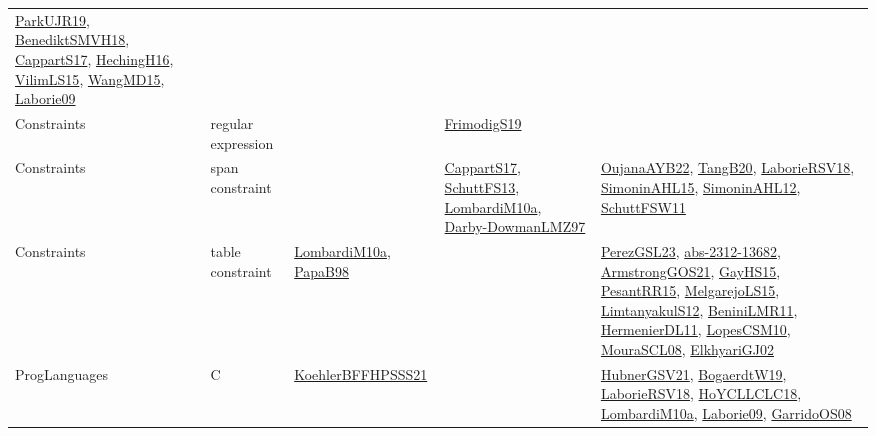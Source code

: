 {\begin{longtable}{lp{3cm}>{\raggedright}p{6cm}>{\raggedright}p{6cm}p{8cm}}
\href{papers/ParkUJR19.pdf}{ParkUJR19}\cite{ParkUJR19}, \href{papers/BenediktSMVH18.pdf}{BenediktSMVH18}\cite{BenediktSMVH18}, \href{papers/CappartS17.pdf}{CappartS17}\cite{CappartS17}, \href{papers/HechingH16.pdf}{HechingH16}\cite{HechingH16}, \href{papers/VilimLS15.pdf}{VilimLS15}\cite{VilimLS15}, \href{articles/WangMD15.pdf}{WangMD15}\cite{WangMD15}, \href{papers/Laborie09.pdf}{Laborie09}\cite{Laborie09}\\
Constraints & regular expression &  & \href{papers/FrimodigS19.pdf}{FrimodigS19}\cite{FrimodigS19} & \\
Constraints & span constraint &  & \href{papers/CappartS17.pdf}{CappartS17}\cite{CappartS17}, \href{papers/SchuttFS13.pdf}{SchuttFS13}\cite{SchuttFS13}, \href{articles/LombardiM10a.pdf}{LombardiM10a}\cite{LombardiM10a}, \href{articles/Darby-DowmanLMZ97.pdf}{Darby-DowmanLMZ97}\cite{Darby-DowmanLMZ97} & \href{papers/OujanaAYB22.pdf}{OujanaAYB22}\cite{OujanaAYB22}, \href{papers/TangB20.pdf}{TangB20}\cite{TangB20}, \href{articles/LaborieRSV18.pdf}{LaborieRSV18}\cite{LaborieRSV18}, \href{articles/SimoninAHL15.pdf}{SimoninAHL15}\cite{SimoninAHL15}, \href{papers/SimoninAHL12.pdf}{SimoninAHL12}\cite{SimoninAHL12}, \href{articles/SchuttFSW11.pdf}{SchuttFSW11}\cite{SchuttFSW11}\\
Constraints & table constraint & \href{articles/LombardiM10a.pdf}{LombardiM10a}\cite{LombardiM10a}, \href{articles/PapaB98.pdf}{PapaB98}\cite{PapaB98} &  & \href{papers/PerezGSL23.pdf}{PerezGSL23}\cite{PerezGSL23}, \href{articles/abs-2312-13682.pdf}{abs-2312-13682}\cite{abs-2312-13682}, \href{papers/ArmstrongGOS21.pdf}{ArmstrongGOS21}\cite{ArmstrongGOS21}, \href{papers/GayHS15.pdf}{GayHS15}\cite{GayHS15}, \href{papers/PesantRR15.pdf}{PesantRR15}\cite{PesantRR15}, \href{papers/MelgarejoLS15.pdf}{MelgarejoLS15}\cite{MelgarejoLS15}, \href{articles/LimtanyakulS12.pdf}{LimtanyakulS12}\cite{LimtanyakulS12}, \href{articles/BeniniLMR11.pdf}{BeniniLMR11}\cite{BeniniLMR11}, \href{papers/HermenierDL11.pdf}{HermenierDL11}\cite{HermenierDL11}, \href{articles/LopesCSM10.pdf}{LopesCSM10}\cite{LopesCSM10}, \href{papers/MouraSCL08.pdf}{MouraSCL08}\cite{MouraSCL08}, \href{papers/ElkhyariGJ02.pdf}{ElkhyariGJ02}\cite{ElkhyariGJ02}\\
ProgLanguages & C  & \href{articles/KoehlerBFFHPSSS21.pdf}{KoehlerBFFHPSSS21}\cite{KoehlerBFFHPSSS21} &  & \href{articles/HubnerGSV21.pdf}{HubnerGSV21}\cite{HubnerGSV21}, \href{papers/BogaerdtW19.pdf}{BogaerdtW19}\cite{BogaerdtW19}, \href{articles/LaborieRSV18.pdf}{LaborieRSV18}\cite{LaborieRSV18}, \href{papers/HoYCLLCLC18.pdf}{HoYCLLCLC18}\cite{HoYCLLCLC18}, \href{articles/LombardiM10a.pdf}{LombardiM10a}\cite{LombardiM10a}, \href{papers/Laborie09.pdf}{Laborie09}\cite{Laborie09}, \href{articles/GarridoOS08.pdf}{GarridoOS08}\cite{GarridoOS08}\\

\end{longtable}}
